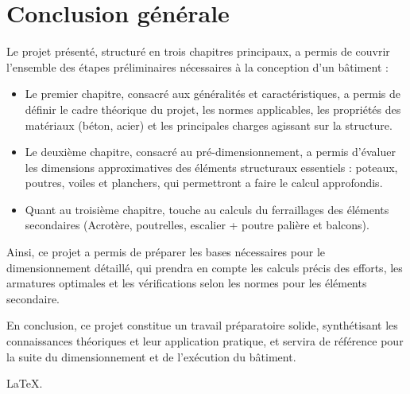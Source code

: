 \documentclass[12pt,a4paper]{report}
\numberwithin{equation}{section}
\begin{document}
	
	
	
	

	
	
	
	
	\chapter*{Conclusion générale}
	
	Le projet présenté, structuré en trois chapitres principaux, a permis de couvrir l’ensemble des étapes préliminaires nécessaires à la conception d’un bâtiment :
	
	\begin{itemize}
		\item Le premier chapitre, consacré aux généralités et caractéristiques, a permis de définir le cadre théorique du projet, les normes applicables, les propriétés des matériaux (béton, acier) et les principales charges agissant sur la structure.
		\item Le deuxième chapitre, consacré au pré-dimensionnement, a permis d’évaluer les dimensions approximatives des éléments structuraux essentiels : poteaux, poutres, voiles et planchers, qui permettront a faire le calcul approfondis.
		\item Quant au troisième chapitre, touche au calculs du ferraillages des éléments secondaires (Acrotère, poutrelles, escalier + poutre palière et balcons).
	\end{itemize}
	
	
	Ainsi, ce projet a permis de préparer les bases nécessaires pour le dimensionnement détaillé, qui prendra en compte les calculs précis des efforts, les armatures optimales et les vérifications selon les normes pour les éléments secondaire.
	
	\vspace{\baselineskip}
	
	En conclusion, ce projet constitue un travail préparatoire solide, synthétisant les connaissances théoriques et leur application pratique, et servira de référence pour la suite du dimensionnement et de l’exécution du bâtiment.
	

	\textcolor{white}{\cite{memoire}\cite{coursba}\cite{DTRCharges}}





	
	
	\printbibliography
	
	\vspace{\baselineskip}
	
	
	\vfill \hfill \Large \LaTeX.
	
	
	
\end{document}
